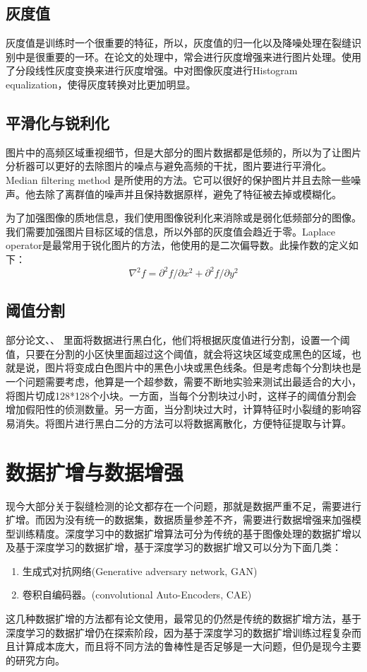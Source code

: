 \documentclass[a4paper,UTF8]{article}
\theoremstyle{definition}
\begin{document}
    \subsection{灰度值}
    灰度值是训练时一个很重要的特征，所以，灰度值的归一化以及降噪处理在裂缝识别中是很重要的一环。在论文的处理中，常会进行灰度增强来进行图片处理。\cite{7}使用了分段线性灰度变换来进行灰度增强。\cite{8}中对图像灰度进行Histogram equalization\cite{9}，使得灰度转换对比更加明显。
    \subsection{平滑化与锐利化}
    图片中的高频区域重视细节，但是大部分的图片数据都是低频的，所以为了让图片分析器可以更好的去除图片的噪点与避免高频的干扰，图片要进行平滑化。Median filtering method\cite{10} 是\cite{8}所使用的方法。它可以很好的保护图片并且去除一些噪声。他去除了离群值的噪声并且保持数据原样，避免了特征被去掉或模糊化。
    
    为了加强图像的质地信息，我们使用图像锐利化来消除或是弱化低频部分的图像。我们需要加强图片目标区域的信息，所以外部的灰度值会趋近于零。Laplace operator是最常用于锐化图片的方法，他使用的是二次偏导数。此操作数的定义如下：
    \begin{equation}
    \nabla^2f = \partial^2 f/\partial x^2 + \partial^2 f/\partial y^2
    \end{equation}
    \subsection{阈值分割}
    部分论文\cite{3}、\cite{7}、\cite{11} 里面将数据进行黑白化，他们将根据灰度值进行分割，设置一个阈值，只要在分割的小区快里面超过这个阈值，就会将这块区域变成黑色的区域，也就是说，图片将变成白色图片中的黑色小块或黑色线条。但是考虑每个分割块也是一个问题需要考虑，他算是一个超参数，需要不断地实验来测试出最适合的大小，\cite{7}将图片切成128*128个小块。一方面，当每个分割块过小时，这样子的阈值分割会增加假阳性的侦测数量。另一方面，当分割块过大时，计算特征时小裂缝的影响容易消失。将图片进行黑白二分的方法可以将数据离散化，方便特征提取与计算。
    
    \section{数据扩增与数据增强}
    现今大部分关于裂缝检测的论文都存在一个问题，那就是数据严重不足，需要进行扩增。而因为没有统一的数据集，数据质量参差不齐，需要进行数据增强来加强模型训练精度。深度学习中的数据扩增算法可分为传统的基于图像处理的数据扩增以及基于深度学习的数据扩增\cite{13}，基于深度学习的数据扩增又可以分为下面几类：
    \begin{enumerate}[(1)]
    	\item 生成式对抗网络(Generative adversary network, GAN)
    	\item 卷积自编码器。(convolutional Auto-Encoders, CAE)
    \end{enumerate}
    这几种数据扩增的方法都有论文使用，最常见的仍然是传统的数据扩增方法，基于深度学习的数据扩增仍在探索阶段，因为基于深度学习的数据扩增训练过程复杂而且计算成本庞大，而且将不同方法的鲁棒性是否足够是一大问题，但仍是现今主要的研究方向。
\end{document}
